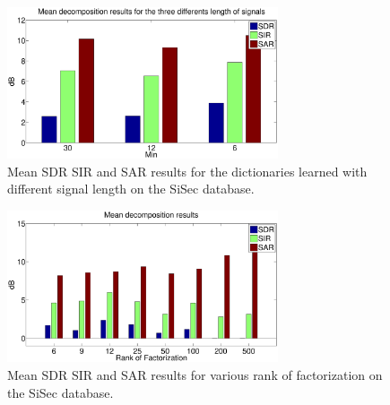 \begin{figure}[t]

  \centering 
  \includegraphics[width=8cm]{fig/ResultsMeanLength}
  \caption{\label{resultsDictLength} Mean SDR SIR and SAR results for the dictionaries learned with different signal length on the SiSec database.}
  
\end{figure}
\begin{figure}[t]

  \centering 
  \includegraphics[width=8cm]{fig/ResultsDictDrummer2}
  \caption{\label{resultsDictD2} Mean SDR SIR and SAR results for various rank of factorization on the SiSec database.}
  
\end{figure}



